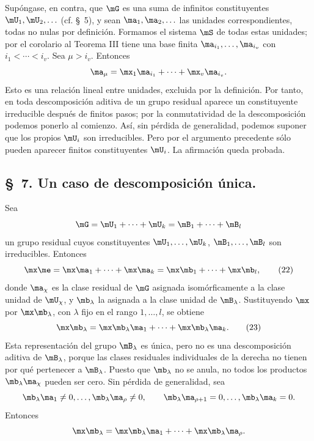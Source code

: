 \documentclass[11pt]{article}
\begin{document}
Supóngase, en contra, que $\mG$ es una suma de infinitos constituyentes $\mU_1,\mU_2,\ldots$ (cf. \S~5), y sean $\ma_1,\ma_2,\ldots$ las unidades correspondientes, todas no nulas por definición. Formamos el sistema $\mS$ de todas estas unidades; por el corolario al Teorema III tiene una base finita $\ma_{i_1},\ldots,\ma_{i_v}$ con $i_1<\cdots<i_v$. Sea $\mu>i_v$. Entonces
\[
 \ma_\mu=\mx_1\ma_{i_1}+\cdots+\mx_v\ma_{i_v}.
\]
Esto es una relación lineal entre unidades, excluida por la definición. Por tanto, en toda descomposición aditiva de un grupo residual aparece un constituyente irreducible después de finitos pasos; por la conmutatividad de la descomposición podemos ponerlo al comienzo. Así, sin pérdida de generalidad, podemos suponer que los propios $\mU_i$ son irreducibles. Pero por el argumento precedente sólo pueden aparecer finitos constituyentes $\mU_i$. La afirmación queda probada.

\subsection*{\S~7. Un caso de descomposición única.}

Sea
\[
 \mG=\mU_1+\cdots+\mU_k=\mB_1+\cdots+\mB_l
\]
un grupo residual cuyos constituyentes $\mU_1,\ldots,\mU_k$, $\mB_1,\ldots,\mB_l$ son irreducibles. Entonces
\begin{equation}
 \mx\me=\mx\ma_1+\cdots+\mx\ma_k
 =\mx\mb_1+\cdots+\mx\mb_l,
\tag{22}
\end{equation}
donde $\ma_\chi$ es la clase residual de $\mG$ asignada isomórficamente a la clase unidad de $\mU_\chi$, y $\mb_\lambda$ la asignada a la clase unidad de $\mB_\lambda$. Sustituyendo $\mx$ por $\mx\mb_\lambda$, con $\lambda$ fijo en el rango $1,\ldots,l$, se obtiene
\begin{equation}
 \mx\mb_\lambda=\mx\mb_\lambda\ma_1+\cdots+\mx\mb_\lambda\ma_k.
\tag{23}
\end{equation}
Esta representación del grupo $\mB_\lambda$ es única, pero no es una descomposición aditiva de $\mB_\lambda$, porque las clases residuales individuales de la derecha no tienen por qué pertenecer a $\mB_\lambda$. Puesto que $\mb_\lambda$ no se anula, no todos los productos $\mb_\lambda\ma_\chi$ pueden ser cero. Sin pérdida de generalidad, sea
\[
 \mb_\lambda\ma_1\ne0,
 \ldots,
 \mb_\lambda\ma_\rho\ne0,
 \qquad
 \mb_\lambda\ma_{\rho+1}=0,
 \ldots,
 \mb_\lambda\ma_k=0.
\]
Entonces
\[
 \mx\mb_\lambda=\mx\mb_\lambda\ma_1+\cdots+\mx\mb_\lambda\ma_\rho.
\]
\end{document}
